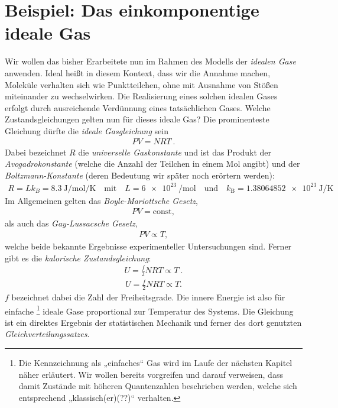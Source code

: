 \section{Beispiel: Das einkomponentige ideale Gas} 
Wir wollen das bisher Erarbeitete nun im Rahmen des Modells der \emph{idealen Gase} anwenden. Ideal heißt in diesem Kontext, dass wir die Annahme machen, Moleküle verhalten sich wie Punktteilchen, ohne \textendash{} mit Ausnahme von Stößen \textendash{} miteinander zu wechselwirken. Die Realisierung eines solchen idealen Gases erfolgt durch ausreichende Verdünnung eines tatsächlichen Gases.
Welche Zustandsgleichungen gelten nun für dieses ideale Gas?
Die prominenteste Gleichung dürfte die \emph{ideale Gasgleichung} sein 
\begin{align*}
    \boxed{PV=NRT}\:.
\end{align*}
Dabei bezeichnet $R$ die \emph{universelle Gaskonstante} und ist das Produkt der \emph{Avogadrokonstante} (welche die Anzahl der Teilchen in einem Mol angibt) und der \emph{Boltzmann-Konstante} (deren Bedeutung wir später noch erörtern werden): 
\begin{align*}
    R=Lk_B=\SI{8,3}{\joule\per\mole\per\kelvin}\quad\text{mit}\quad L=\SI{6e23}{\per\mole}\quad\text{und}\quad k_\mathrm{B}=\SI{1,38064852e23}{\joule\per\kelvin}
\end{align*}
Im Allgemeinen gelten das \emph{Boyle-Mariottsche Gesetz},
\begin{align*}
    PV=\mathrm{const},
\end{align*}
als auch das \emph{Gay-Lussacsche Gesetz}, 
\begin{align*}
    PV\propto T,
\end{align*}
welche beide bekannte Ergebnisse experimenteller Untersuchungen sind.
Ferner gibt es die \emph{kalorische Zustandsgleichung}: 
\begin{align*}
    \boxed{U=\frac{f}{2}NRT\propto T}\:.
\end{align*} 
\begin{align*}
    \boxed{U=\frac{f}{2}NRT\propto T.}
\end{align*} 
$f$ bezeichnet dabei die Zahl der Freiheitsgrade. Die innere Energie ist also für einfache \footnote{Die Kennzeichnung als „einfaches“ Gas wird im Laufe der nächsten Kapitel näher erläutert. Wir wollen bereits vorgreifen und darauf verweisen, dass damit Zustände mit höheren Quantenzahlen beschrieben werden, welche sich entsprechend „klassisch(er)(??)“ verhalten.} ideale Gase proportional zur Temperatur des Systems. 
Die Gleichung ist ein direktes Ergebnis der statistischen Mechanik und ferner des dort genutzten \emph{Gleichverteilungssatzes}.
